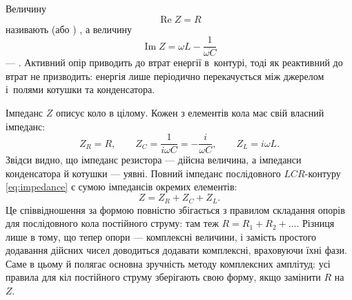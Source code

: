 %
%
%
%
%
%

Величину
\begin{equation}\label{eq:active_resistance}
	\operatorname{Re} Z = R
\end{equation}
називають  (або ) , а величину
\begin{equation}\label{eq:reactive_resistance}
	\operatorname{Im} Z = \omega L - \frac{1}{\omega C}
\end{equation}
--- . Активний опір приводить до втрат енергії в~контурі, тоді як реактивний до втрат не призводить: енергія лише періодично перекачується між джерелом і~полями котушки та конденсатора.

Імпеданс $Z$ описує коло в цілому. Кожен з елементів кола має свій власний імпеданс:
\begin{equation}\label{eq:element_impedances}
	Z_R = R, \qquad Z_C = \frac{1}{i\omega C} = -\frac{i}{\omega C}, \qquad Z_L = i\omega L.
\end{equation}
Звідси видно, що імпеданс резистора --- дійсна величина, а імпеданси конденсатора й котушки --- уявні.  Повний імпеданс послідовного $LCR$-контуру \eqref{eq:impedance} є сумою імпедансів окремих елементів:
\begin{equation}\label{eq:impedance_sum}
	Z = Z_R + Z_C + Z_L.
\end{equation}
Це співвідношення за формою повністю збігається з правилом складання опорів для послідовного кола постійного струму: там теж $R = R_1 + R_2 + \dots$. Різниця лише в тому, що тепер опори --- комплексні величини, і замість простого додавання дійсних чисел доводиться додавати комплексні, враховуючи їхні фази. Саме в цьому й полягає основна зручність методу комплексних амплітуд: усі правила для кіл постійного струму зберігають свою форму, якщо замінити $R$ на $Z$.

